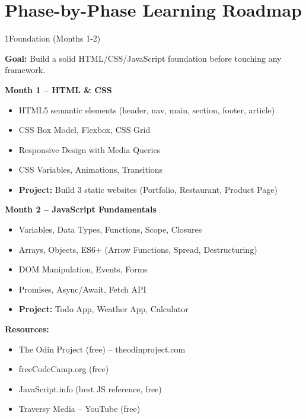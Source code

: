 \documentclass[12pt,a4paper]{article}
\begin{document}
\newpage

\section{Phase-by-Phase Learning Roadmap}

\begin{roadmapstep}{1}{Foundation (Months 1-2)}

\textbf{Goal:} Build a solid HTML/CSS/JavaScript foundation before touching any framework.

\vspace{0.3cm}
\textbf{\color{FaranBlue}Month 1 -- HTML \& CSS}
\begin{itemize}[leftmargin=1.5em, itemsep=4pt]
    \item[\ding{62}] HTML5 semantic elements (header, nav, main, section, footer, article)
    \item[\ding{62}] CSS Box Model, Flexbox, CSS Grid
    \item[\ding{62}] Responsive Design with Media Queries
    \item[\ding{62}] CSS Variables, Animations, Transitions
    \item[\ding{62}] \textbf{Project:} Build 3 static websites (Portfolio, Restaurant, Product Page)
\end{itemize}

\vspace{0.3cm}
\textbf{\color{FaranBlue}Month 2 -- JavaScript Fundamentals}
\begin{itemize}[leftmargin=1.5em, itemsep=4pt]
    \item[\ding{62}] Variables, Data Types, Functions, Scope, Closures
    \item[\ding{62}] Arrays, Objects, ES6+ (Arrow Functions, Spread, Destructuring)
    \item[\ding{62}] DOM Manipulation, Events, Forms
    \item[\ding{62}] Promises, Async/Await, Fetch API
    \item[\ding{62}] \textbf{Project:} Todo App, Weather App, Calculator
\end{itemize}

\vspace{0.3cm}
\begin{tcolorbox}[colback=FaranAccent!10, colframe=FaranAccent, boxrule=0.8pt]
\textbf{\color{FaranAccent}Resources:}
\begin{itemize}[leftmargin=1.2em, noitemsep]
    \item The Odin Project (free) -- theodinproject.com
    \item freeCodeCamp.org (free)
    \item JavaScript.info (best JS reference, free)
    \item Traversy Media -- YouTube (free)
\end{itemize}
\end{tcolorbox}

\end{roadmapstep}
\end{document}
